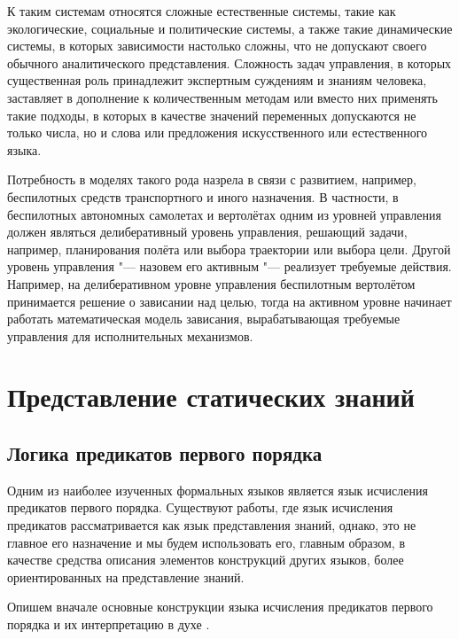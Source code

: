 \documentclass[b5paper,11pt]{book}
\begin{document}
	К таким системам относятся сложные естественные системы, такие как экологические, социальные и политические системы, а также такие динамические системы, в которых зависимости настолько сложны, что не допускают своего обычного аналитического представления. Сложность задач управления, в которых существенная роль принадлежит экспертным суждениям и знаниям человека, заставляет в дополнение к количественным методам или вместо них применять такие подходы, в которых в качестве значений переменных допускаются не только числа, но и слова или предложения искусственного или естественного языка. 
	
	Потребность в моделях такого рода назрела в связи с развитием, например, беспилотных средств транспортного и иного назначения. В частности, в беспилотных автономных самолетах и вертолётах одним из уровней управления должен являться делиберативный уровень управления, решающий задачи, например, планирования полёта или выбора траектории или выбора цели. Другой уровень управления "--- назовем его активным "--- реализует требуемые действия. Например, на  делиберативном уровне управления беспилотным вертолётом принимается решение о зависании над целью, тогда на активном уровне начинает работать математическая модель зависания, вырабатывающая требуемые управления для исполнительных механизмов.
	
	\chapter{Представление статических знаний}
	
	\section{Логика предикатов первого порядка}
	Одним из наиболее изученных формальных языков является язык исчисления предикатов первого порядка. Существуют работы, где язык исчисления предикатов рассматривается как язык представления знаний, однако, это не главное его назначение и мы будем использовать его, главным образом, в качестве средства описания элементов конструкций других языков, более ориентированных на представление знаний. 
	
	Опишем вначале основные конструкции языка исчисления предикатов первого порядка и их интерпретацию в духе \cite{Klini1973,Keisler1977}.
	
\end{document}
